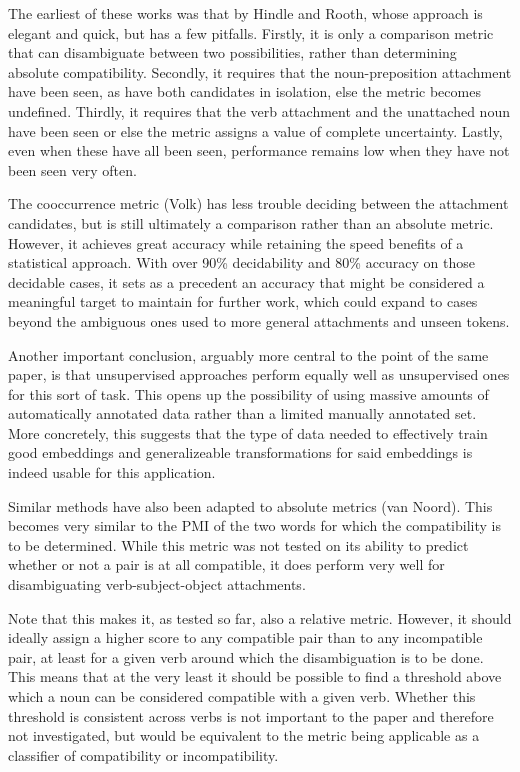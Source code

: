 \documentclass[a4paper, 11pt]{scrartcl}
\begin{document}
The earliest of these works was that by Hindle and Rooth, whose approach is elegant and quick, but has a few pitfalls. Firstly, it is only a comparison metric that can disambiguate between two possibilities, rather than determining absolute compatibility. Secondly, it requires that the noun-preposition attachment have been seen, as have both candidates in isolation, else the metric becomes undefined. Thirdly, it requires that the verb attachment and the unattached noun have been seen or else the metric assigns a value of complete uncertainty. Lastly, even when these have all been seen, performance remains low when they have not been seen very often.

The cooccurrence metric (Volk) has less trouble deciding between the attachment candidates, but is still ultimately a comparison rather than an absolute metric. However, it achieves great accuracy while retaining the speed benefits of a statistical approach. With over 90\% decidability and 80\% accuracy on those decidable cases, it sets as a precedent an accuracy that might be considered a meaningful target to maintain for further work, which could expand to cases beyond the ambiguous ones used to more general attachments and unseen tokens.

Another important conclusion, arguably more central to the point of the same paper, is that unsupervised approaches perform equally well as unsupervised ones for this sort of task. This opens up the possibility of using massive amounts of automatically annotated data rather than a limited manually annotated set. More concretely, this suggests that the type of data needed to effectively train good embeddings and generalizeable transformations for said embeddings is indeed usable for this application.

Similar methods have also been adapted to absolute metrics (van Noord). This becomes very similar to the PMI of the two words for which the compatibility is to be determined. While this metric was not tested on its ability to predict whether or not a pair is at all compatible, it does perform very well for disambiguating verb-subject-object attachments.

Note that this makes it, as tested so far, also a relative metric. However, it should ideally assign a higher score to any compatible pair than to any incompatible pair, at least for a given verb around which the disambiguation is to be done. This means that at the very least it should be possible to find a threshold above which a noun can be considered compatible with a given verb. Whether this threshold is consistent across verbs is not important to the paper and therefore not investigated, but would be equivalent to the metric being applicable as a classifier of compatibility or incompatibility.
\end{document}
